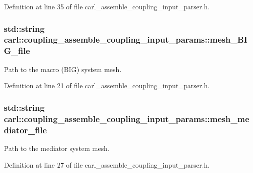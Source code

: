 Definition at line 35 of file carl\+\_\+assemble\+\_\+coupling\+\_\+input\+\_\+parser.\+h.

\hypertarget{structcarl_1_1coupling__assemble__coupling__input__params_af311a867cd2103103da6f37851832d18}{}
\subsubsection[{mesh\+\_\+\+B\+I\+G\+\_\+file}]{\setlength{\rightskip}{0pt plus 5cm}std\+::string carl\+::coupling\+\_\+assemble\+\_\+coupling\+\_\+input\+\_\+params\+::mesh\+\_\+\+B\+I\+G\+\_\+file}\label{structcarl_1_1coupling__assemble__coupling__input__params_af311a867cd2103103da6f37851832d18}


Path to the macro (B\+I\+G) system mesh. 



Definition at line 21 of file carl\+\_\+assemble\+\_\+coupling\+\_\+input\+\_\+parser.\+h.

\hypertarget{structcarl_1_1coupling__assemble__coupling__input__params_a4fa79c1dc75b71bbda8e54d351ede2d2}{}
\subsubsection[{mesh\+\_\+mediator\+\_\+file}]{\setlength{\rightskip}{0pt plus 5cm}std\+::string carl\+::coupling\+\_\+assemble\+\_\+coupling\+\_\+input\+\_\+params\+::mesh\+\_\+mediator\+\_\+file}\label{structcarl_1_1coupling__assemble__coupling__input__params_a4fa79c1dc75b71bbda8e54d351ede2d2}


Path to the mediator system mesh. 



Definition at line 27 of file carl\+\_\+assemble\+\_\+coupling\+\_\+input\+\_\+parser.\+h.

